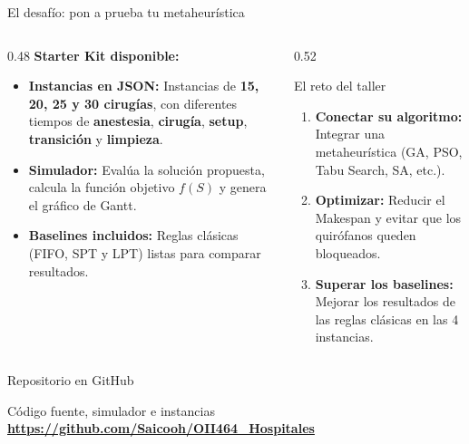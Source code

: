 \documentclass[aspectratio=169,11pt]{beamer}
\begin{document}
\begin{frame}{El desafío: pon a prueba tu metaheurística}
  \begin{columns}[t]
    \begin{column}{0.48\textwidth}
      \textbf{\color{primary}Starter Kit disponible:}
      \small
      \begin{itemize}
        \item \textbf{Instancias en JSON:} Instancias de \textbf{15, 20, 25 y 30 cirugías}, con diferentes tiempos de \textbf{anestesia}, \textbf{cirugía}, \textbf{setup}, \textbf{transición} y \textbf{limpieza}.
        \item \textbf{Simulador:} Evalúa la solución propuesta, calcula la función objetivo $f(S)$ y genera el gráfico de Gantt.
        \item \textbf{Baselines incluidos:} Reglas clásicas (FIFO, SPT y LPT) listas para comparar resultados.
      \end{itemize}
    \end{column}

    \begin{column}{0.52\textwidth}
      \begin{exampleblock}{El reto del taller}
        \small
        \begin{enumerate}
          \item \textbf{Conectar su algoritmo:} Integrar una metaheurística (GA, PSO, Tabu Search, SA, etc.).
          \item \textbf{Optimizar:} Reducir el Makespan y evitar que los quirófanos queden bloqueados.
          \item \textbf{Superar los baselines:} Mejorar los resultados de las reglas clásicas en las 4 instancias.
        \end{enumerate}
      \end{exampleblock}
    \end{column}
  \end{columns}
\end{frame}

\begin{frame}[c]{Repositorio en GitHub}
  \vfill
  \centering
  \begin{minipage}{0.85\textwidth}
    \begin{block}{Código fuente, simulador e instancias}
      \centering\vspace{0.25cm}
      {\large\color{primary}\textbf{\url{https://github.com/Saicooh/OII464_Hospitales}}}
      \vspace{0.25cm}
    \end{block}
  \end{minipage}
  \vfill
\end{frame}
\end{document}
